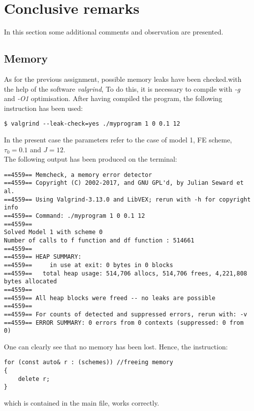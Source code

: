 \documentclass[11pt]{article}
\theoremstyle{theorem}
\theoremstyle{definition}
\begin{document}
\section{Conclusive remarks}
In this section some additional comments and observation are presented.

\subsection{Memory}
As for the previous assignment, possible memory leaks have been checked.with the help of the software \emph{valgrind}, To do this, it is necessary to compile with \emph{-g} and \emph{-O1} optimisation. After having compiled the program, the following instruction has been used:


\begin{lstlisting}
$ valgrind --leak-check=yes ./myprogram 1 0 0.1 12
\end{lstlisting}

In the present case the parameters refer to the case of model 1, FE scheme, $\tau_0=0.1$ and $J=12$.\\

The following output has been produced on the terminal:

\begin{verbatim}
==4559== Memcheck, a memory error detector
==4559== Copyright (C) 2002-2017, and GNU GPL'd, by Julian Seward et al.
==4559== Using Valgrind-3.13.0 and LibVEX; rerun with -h for copyright info
==4559== Command: ./myprogram 1 0 0.1 12
==4559== 
Solved Model 1 with scheme 0
Number of calls to f function and df function : 514661
==4559== 
==4559== HEAP SUMMARY:
==4559==     in use at exit: 0 bytes in 0 blocks
==4559==   total heap usage: 514,706 allocs, 514,706 frees, 4,221,808 bytes allocated
==4559== 
==4559== All heap blocks were freed -- no leaks are possible
==4559== 
==4559== For counts of detected and suppressed errors, rerun with: -v
==4559== ERROR SUMMARY: 0 errors from 0 contexts (suppressed: 0 from 0)
\end{verbatim}

One can clearly see that no memory has been lost. Hence, the instruction:

\begin{lstlisting}
for (const auto& r : (schemes)) //freeing memory
{
	delete r;
}
\end{lstlisting}

which is contained in the main file, works correctly.\\
\end{document}
